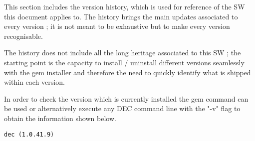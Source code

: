 \documentclass[dec_sum_main.tex]{subfiles}
\begin{document}
 
\par
\noindent
This section includes the version history, which is used for reference of the SW this document applies to. The history brings the main updates associated to every version ; it is not meant to be exhaustive but to make every version recognisable.\newline

\par
\noindent
The history does not include all the long heritage associated to this SW ; the starting point is the capacity to install / uninstall different versions seamlessly with the gem installer and therefore the need to quickly identify what is shipped within each version. \newline

\par
\noindent 
In order to check the version which is currently installed the gem command can be used or alternatively execute any DEC command line with the "-v" flag to obtain the information shown below. \newline


\begin{Verbatim}[tabsize=4]
    dec (1.0.41.9)
\end{Verbatim}

\end{document}
